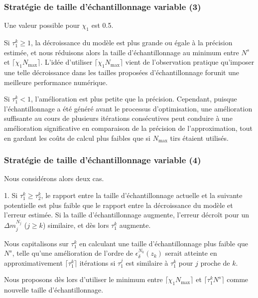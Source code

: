 \documentclass[french]{beamer}
\begin{document}
\begin{frame}
\frametitle{Stratégie de taille d'échantillonnage variable (3)}

Une valeur possible pour $\chi_1$ est 0.5.

\mbox{}

Si $\tau_1^k \geq 1$, la décroissance du modèle est plus grande ou
égale à la précision estimée, et nous réduisons alors la taille
d'échantillonnage au minimum entre $N^s$ et $\lceil \chi_1 N_{\max}
\rceil$.
L'idée d'utiliser $\lceil \chi_1 N_{\max} \rceil$ vient de
l'observation pratique qu'imposer une telle décroissance dans les
tailles proposées d'échantillonnage forunit une meilleure performance
numérique.

\mbox{}

Si $\tau_1^k < 1$, l'amélioration est plus petite que la précision.
Cependant, puisque l'échantillonnage a été généré avant le processus
d'optimisation, une amélioration suffisante au cours de plusieurs
itérations consécutives peut conduire à une amélioration significative
en comparaison de la précision de l'approximation, tout en gardant les
coûts de calcul plus faibles que si $N_{\max}$ tirs étaient utilisés.

\end{frame}

\begin{frame}
\frametitle{Stratégie de taille d'échantillonnage variable (4)}

Nous considérons alors deux cas.

\mbox{}

1. Si $\tau_1^k \geq \tau_2^k$, le rapport entre la taille
d'échantillonnage actuelle et la suivante potentielle est plus faible
que le rapport entre la décroissance du modèle et l'erreur estimée.
Si la taille d'échantillonnage augmente, l'erreur décroît pour un
$\Delta m_j^{N_j}$ ($j \geq k$) similaire, et dès lors $\tau_1^k$
augmente.

Nous capitalisons sur $\tau_1^k$ en calculant une taille
d'échantillonnage plus faible que $N^s$, telle qu'une amélioration de
l'ordre de $\epsilon_\delta^{N_k}(z_k)$ serait atteinte en
approximativement $\lceil \tau_1^k \rceil$ itérations si $\tau_1^j$
est similaire à $\tau_1^k$ pour $j$ proche de $k$.

Nous proposons dès lors d'utiliser le minimum entre $\lceil \chi_1
N_{\max} \rceil$ et $\lceil \tau_1^k N^s \rceil$ comme nouvelle taille
d'échantillonnage.

\end{frame}
\end{document}
